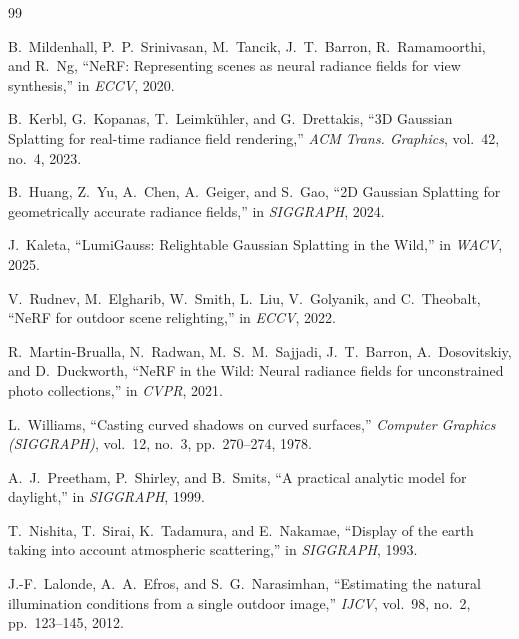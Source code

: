 {\small

\begin{thebibliography}{99}

    B.~Mildenhall, P.~P.~Srinivasan, M.~Tancik, J.~T.~Barron, R.~Ramamoorthi, and R.~Ng,
    ``NeRF: Representing scenes as neural radiance fields for view synthesis,''
    in \emph{ECCV}, 2020.

    B.~Kerbl, G.~Kopanas, T.~Leimk{\"u}hler, and G.~Drettakis,
    ``3D Gaussian Splatting for real-time radiance field rendering,''
    \emph{ACM Trans. Graphics}, vol.~42, no.~4, 2023.

    B.~Huang, Z.~Yu, A.~Chen, A.~Geiger, and S.~Gao,
    ``2D Gaussian Splatting for geometrically accurate radiance fields,''
    in \emph{SIGGRAPH}, 2024.

    J.~Kaleta,
    ``LumiGauss: Relightable Gaussian Splatting in the Wild,''
    in \emph{WACV}, 2025.

    V.~Rudnev, M.~Elgharib, W.~Smith, L.~Liu, V.~Golyanik, and C.~Theobalt,
    ``NeRF for outdoor scene relighting,''
    in \emph{ECCV}, 2022.

    R.~Martin-Brualla, N.~Radwan, M.~S.~M.~Sajjadi, J.~T.~Barron, A.~Dosovitskiy, and D.~Duckworth,
    ``NeRF in the Wild: Neural radiance fields for unconstrained photo collections,''
    in \emph{CVPR}, 2021.

    L.~Williams,
    ``Casting curved shadows on curved surfaces,''
    \emph{Computer Graphics (SIGGRAPH)}, vol.~12, no.~3, pp.~270--274, 1978.

    A.~J.~Preetham, P.~Shirley, and B.~Smits,
    ``A practical analytic model for daylight,''
    in \emph{SIGGRAPH}, 1999.

    T.~Nishita, T.~Sirai, K.~Tadamura, and E.~Nakamae,
    ``Display of the earth taking into account atmospheric scattering,''
    in \emph{SIGGRAPH}, 1993.

    J.-F.~Lalonde, A.~A.~Efros, and S.~G.~Narasimhan,
    ``Estimating the natural illumination conditions from a single outdoor image,''
    \emph{IJCV}, vol.~98, no.~2, pp.~123--145, 2012.


\end{thebibliography}}
